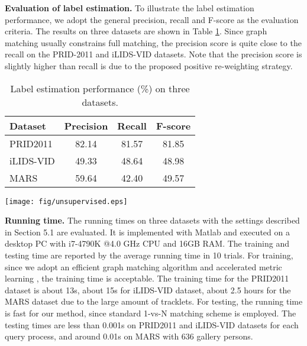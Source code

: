 \documentclass[10pt,twocolumn,letterpaper]{article}
\begin{document}
\textbf{Evaluation of label estimation.}
To illustrate the label estimation performance, we adopt the general precision, recall and F-score as the evaluation criteria. The results on three datasets are shown in Table \ref{tab:label}. Since graph matching usually constrains full matching, the precision score is quite close to the recall on the PRID-2011 and iLIDS-VID datasets. Note that the precision score is slightly higher than recall is due to the proposed positive re-weighting strategy.
\begin{table}[t]\small
\centering
\setlength{\tabcolsep}{11pt}
  \begin{tabular*}{\columnwidth}{l|ccc}
  \hline
  Dataset  & Precision   & Recall & F-score \\\hline
  PRID2011  & 82.14     &81.57  & 81.85 \\
  iLIDS-VID & 49.33     &48.64  & 48.98 \\
  MARS      & 59.64     &42.40  & 49.57 \\ \hline
 \end{tabular*}
 \caption{\label{tab:label}\small{Label estimation performance (\%) on three datasets.}}
\end{table}
\begin{figure*}[t]
  \centering
  \texttt{[image: fig/unsupervised.eps]}
\caption{\small{Estimated labels for other supervised learning methods. ``DGM" represents the re-identification performance with our estimated labels. ``GT" provides upper bounds with fully supervised learning. Rank-1 matching rates (\%) are reported for three datasets.}}\label{fig:super}
\vspace{-0.1cm}
\end{figure*}

\textbf{Running time.}
The running times on three datasets with the settings described in Section 5.1 are evaluated. It is implemented with Matlab and executed on a desktop PC with i7-4790K @4.0 GHz CPU and 16GB RAM. The training and testing time are reported by the average running time in 10 trials. For training, since we adopt an efficient graph matching algorithm and accelerated metric learning \cite{iccv15liao}, the training time is acceptable. The training time for the PRID2011 dataset is about 13s, about 15s for iLIDS-VID dataset, about 2.5 hours for the MARS dataset due to the large amount of tracklets. For testing, the running time is fast for our method, since standard 1-vs-N matching scheme is employed. The testing times are less than 0.001s on PRID2011 and iLIDS-VID datasets for each query process, and around 0.01s on MARS with 636 gallery persons.
\end{document}
